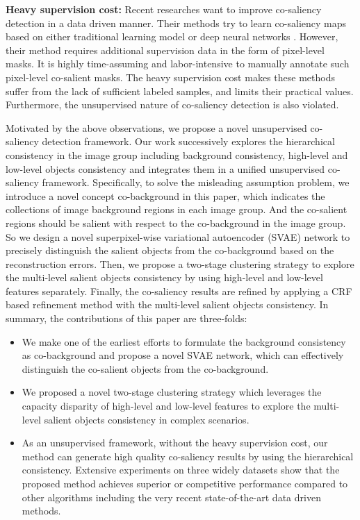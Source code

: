\documentclass[sigconf]{acmart}
\begin{document}
\noindent \textbf{Heavy supervision cost:} Recent researches want to improve co-saliency detection in a data driven manner. Their methods try to learn co-saliency maps based on either traditional learning model \cite{han2017unified,zhang2017co,DBLP:conf/mm/ZhengZZ18} or deep neural networks \cite{DBLP:conf/ijcai/WeiZBLW17}. However, their method requires additional supervision data in the form of pixel-level masks. It is highly time-assuming and labor-intensive to manually annotate such pixel-level co-salient masks. The heavy supervision cost makes these methods suffer from the lack of sufficient labeled samples, and limits their practical values. Furthermore, the unsupervised nature of co-saliency detection is also violated.

Motivated by the above observations, we propose a novel unsupervised co-saliency detection framework. Our work successively explores the hierarchical consistency in the image group including background consistency, high-level and low-level objects consistency and integrates them in a unified unsupervised co-saliency framework. Specifically, to solve the misleading assumption problem, we introduce a novel concept co-background in this paper, which indicates the collections of image background regions in each image group. And the co-salient regions should be salient with respect to the co-background in the image group. So we design a novel superpixel-wise variational autoencoder (SVAE) network to precisely distinguish the salient objects from the co-background based on the reconstruction errors. Then, we propose a two-stage clustering strategy to explore the multi-level salient objects consistency by using high-level and low-level features separately.  Finally, the co-saliency results are refined by applying a CRF based refinement method with the multi-level salient objects consistency. In summary, the contributions of this paper are three-folds:
\begin{itemize}
\item We make one of the earliest efforts to formulate the background consistency as co-background and propose a novel SVAE network, which can effectively distinguish the co-salient objects from the co-background.
\item We proposed a novel two-stage clustering strategy which leverages the capacity disparity of high-level and low-level features to explore the multi-level salient objects consistency in complex scenarios.
\item As an unsupervised framework, without the heavy supervision cost, our method can generate high quality co-saliency results by using the hierarchical consistency. Extensive experiments on three widely datasets show that the proposed method achieves superior or competitive performance compared to other algorithms including the very recent state-of-the-art data driven methods.
\end{itemize}
\end{document}
